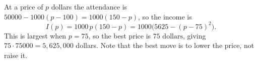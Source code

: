 At a price of $p$ dollars the attendance is $50000-1000(p-100)=1000(150-p)$, so the income is
\[
I(p)=1000\,p(150-p)=1000\bigl(5625-(p-75)^2\bigr).
\]
This is largest when $p=75$, so the best price is $\boxed{75\text{ dollars}}$, giving $75\cdot75000=5{,}625{,}000$ dollars. Note that the best move is to lower the price, not raise it.
